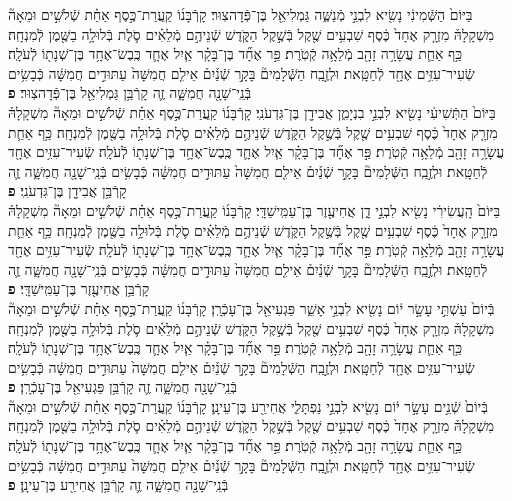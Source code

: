 \documentclass[twoside, openany, parskip=half, 11pt]{book}
\begin{document}
\begin{footnotesize}
\begin{multicols}{2}
בַּיּוֹם֙ הַשְּֿׁמִינִ֔י נָשִׂ֖יא לִבְנֵ֣י מְֿנַשֶּׁ֑ה גַּמְלִיאֵ֖ל בֶּן־פְּֿדָהצֽוּר׃ קָרְֿבָּנ֜וֹ קַֽעֲרַת־כֶּ֣סֶף אַחַ֗ת שְֿׁלֹשִׁ֣ים וּמֵאָה֘ מִשְׁקָלָהּ֒ מִזְרָ֤ק אֶחָד֙ כֶּ֔סֶף שִׁבְעִ֥ים שֶׁ֖קֶל בְּֿשֶׁ֣קֶל הַקֹּ֑דֶשׁ שְֿׁנֵיהֶ֣ם מְֿלֵאִ֗ים סֹ֛לֶת בְּֿלוּלָ֥ה בַשֶּׁ֖מֶן לְֿמִנְחָֽה׃ כַּ֥ף אַחַ֛ת עֲשָׂרָ֥ה זָהָ֖ב מְֿלֵאָ֥ה קְֿטֹֽרֶת׃  פַּ֣ר אֶחָ֞ד בֶּן־בָּקָ֗ר אַ֧יִל אֶחָ֛ד כֶּֽבֶשׂ־אֶחָ֥ד בֶּן־שְׁנָת֖וֹ לְֿעֹלָֽה׃ שְֿׂעִיר־עִזִּ֥ים אֶחָ֖ד לְֿחַטָּֽאת׃ וּלְזֶ֣בַֽח הַשְּֿׁלָמִים֘ בָּקָ֣ר שְֿׁנַ֒יִם֒ אֵילִ֤ם חֲמִשָּׁה֙ עַתּוּדִ֣ים חֲמִשָּׁ֔ה כְּֿבָשִׂ֥ים בְּֿנֵֽי־שָׁנָ֖ה חֲמִשָּׁ֑ה זֶ֛ה קָרְֿבַּ֥ן גַּמְלִיאֵ֖ל בֶּן־פְּֿדָהצֽוּר׃ \textbf{פ} \\
 בַּיּוֹם֙ הַתְּֿשִׁיעִ֔י נָשִׂ֖יא לִבְנֵ֣י בִנְיָמִ֑ן אֲבִידָ֖ן בֶּן־גִּדְעֹנִֽי׃ קָרְֿבָּנ֜וֹ קַֽעֲרַת־כֶּ֣סֶף אַחַ֗ת שְֿׁלֹשִׁ֣ים וּמֵאָה֘ מִשְׁקָלָהּ֒ מִזְרָ֤ק אֶחָד֙ כֶּ֔סֶף שִׁבְעִ֥ים שֶׁ֖קֶל בְּֿשֶׁ֣קֶל הַקֹּ֑דֶשׁ שְֿׁנֵיהֶ֣ם מְֿלֵאִ֗ים סֹ֛לֶת בְּֿלוּלָ֥ה בַשֶּׁ֖מֶן לְֿמִנְחָֽה׃ כַּ֥ף אַחַ֛ת עֲשָׂרָ֥ה זָהָ֖ב מְֿלֵאָ֥ה קְֿטֹֽרֶת׃ פַּ֣ר אֶחָ֞ד בֶּן־בָּקָ֗ר אַ֧יִל אֶחָ֛ד כֶּֽבֶשׂ־אֶחָ֥ד בֶּן־שְׁנָת֖וֹ לְֿעֹלָֽה׃ שְֿׂעִיר־עִזִּ֥ים אֶחָ֖ד לְֿחַטָּֽאת׃ וּלְזֶ֣בַֽח הַשְּֿׁלָמִים֘ בָּקָ֣ר שְֿׁנַ֒יִם֒ אֵילִ֤ם חֲמִשָּׁה֙ עַתּוּדִ֣ים חֲמִשָּׁ֔ה כְּֿבָשִׂ֥ים בְּֿנֵֽי־שָׁנָ֖ה חֲמִשָּׁ֑ה זֶ֛ה קָרְֿבַּ֥ן אֲבִידָ֖ן בֶּן־גִּדְעֹנִֽי׃ \textbf{פ} \\
בַּיּוֹם֙ הָֽעֲשִׂירִ֔י נָשִׂ֖יא לִבְנֵ֣י דָ֑ן אֲחִיעֶ֖זֶר בֶּן־עַמִּֽישַׁדָּֽי׃ קָרְֿבָּנ֜וֹ קַֽעֲרַת־כֶּ֣סֶף אַחַ֗ת שְֿׁלֹשִׁ֣ים וּמֵאָה֘ מִשְׁקָלָהּ֒ מִזְרָ֤ק אֶחָד֙ כֶּ֔סֶף שִׁבְעִ֥ים שֶׁ֖קֶל בְּֿשֶׁ֣קֶל הַקֹּ֑דֶשׁ שְֿׁנֵיהֶ֣ם מְֿלֵאִ֗ים סֹ֛לֶת בְּֿלוּלָ֥ה בַשֶּׁ֖מֶן לְֿמִנְחָֽה׃ כַּ֥ף אַחַ֛ת עֲשָׂרָ֥ה זָהָ֖ב מְֿלֵאָ֥ה קְֿטֹֽרֶת׃ פַּ֣ר אֶחָ֞ד בֶּן־בָּקָ֗ר אַ֧יִל אֶחָ֛ד כֶּֽבֶשׂ־אֶחָ֥ד בֶּן־שְׁנָת֖וֹ לְֿעֹלָֽה׃ שְֿׂעִיר־עִזִּ֥ים אֶחָ֖ד לְֿחַטָּֽאת׃ וּלְזֶ֣בַֽח הַשְּֿׁלָמִים֘ בָּקָ֣ר שְֿׁנַ֒יִם֒ אֵילִ֤ם חֲמִשָּׁה֙ עַתּוּדִ֣ים חֲמִשָּׁ֔ה כְּֿבָשִׂ֥ים בְּֿנֵֽי־שָׁנָ֖ה חֲמִשָּׁ֑ה זֶ֛ה קָרְֿבַּ֥ן אֲחִיעֶ֖זֶר בֶּן־עַמִּֽישַׁדָּֽי׃ \textbf{פ} \\
בְּֿיוֹם֙ עַשְׁתֵּ֣י עָשָׂ֣ר י֔וֹם נָשִׂ֖יא לִבְנֵ֣י אָשֵׁ֑ר פַּגְעִיאֵ֖ל בֶּן־עָכְֿרָֽן׃ קָרְֿבָּנ֜וֹ קַֽעֲרַת־כֶּ֣סֶף אַחַ֗ת שְֿׁלֹשִׁ֣ים וּמֵאָה֘ מִשְׁקָלָהּ֒ מִזְרָ֤ק אֶחָד֙ כֶּ֔סֶף שִׁבְעִ֥ים שֶׁ֖קֶל בְּֿשֶׁ֣קֶל הַקֹּ֑דֶשׁ שְֿׁנֵיהֶ֣ם מְֿלֵאִ֗ים סֹ֛לֶת בְּֿלוּלָ֥ה בַשֶּׁ֖מֶן לְֿמִנְחָֽה׃ כַּ֥ף אַחַ֛ת עֲשָׂרָ֥ה זָהָ֖ב מְֿלֵאָ֥ה קְֿטֹֽרֶת׃ פַּ֣ר אֶחָ֞ד בֶּן־בָּקָ֗ר אַ֧יִל אֶחָ֛ד כֶּֽבֶשׂ־אֶחָ֥ד בֶּן־שְׁנָת֖וֹ לְֿעֹלָֽה׃ שְֿׂעִיר־עִזִּ֥ים אֶחָ֖ד לְֿחַטָּֽאת׃ וּלְזֶ֣בַֽח הַשְּֿׁלָמִים֘ בָּקָ֣ר שְֿׁנַ֒יִם֒ אֵילִ֤ם חֲמִשָּׁה֙ עַתּוּדִ֣ים חֲמִשָּׁ֔ה כְּֿבָשִׂ֥ים בְּֿנֵֽי־שָׁנָ֖ה חֲמִשָּׁ֑ה זֶ֛ה קָרְֿבַּ֥ן פַּגְעִיאֵ֖ל בֶּן־עָכְֿרָֽן׃ \textbf{פ} \\
בְּֿיוֹם֙ שְֿׁנֵ֣ים עָשָׂ֣ר י֔וֹם נָשִׂ֖יא לִבְנֵ֣י נַפְתָּלִ֑י אֲחִירַ֖ע בֶּן־עֵינָֽן׃ קָרְֿבָּנ֜וֹ קַֽעֲרַת־כֶּ֣סֶף אַחַ֗ת שְֿׁלֹשִׁ֣ים וּמֵאָה֘ מִשְׁקָלָהּ֒ מִזְרָ֤ק אֶחָד֙ כֶּ֔סֶף שִׁבְעִ֥ים שֶׁ֖קֶל בְּֿשֶׁ֣קֶל הַקֹּ֑דֶשׁ שְֿׁנֵיהֶ֣ם מְֿלֵאִ֗ים סֹ֛לֶת בְּֿלוּלָ֥ה בַשֶּׁ֖מֶן לְֿמִנְחָֽה׃ כַּ֥ף אַחַ֛ת עֲשָׂרָ֥ה זָהָ֖ב מְֿלֵאָ֥ה קְֿטֹֽרֶת׃ פַּ֣ר אֶחָ֞ד בֶּן־בָּקָ֗ר אַ֧יִל אֶחָ֛ד כֶּֽבֶשׂ־אֶחָ֥ד בֶּן־שְׁנָת֖וֹ לְֿעֹלָֽה׃ שְֿׂעִיר־עִזִּ֥ים אֶחָ֖ד לְֿחַטָּֽאת׃ וּלְזֶ֣בַֽח הַשְּֿׁלָמִים֘ בָּקָ֣ר שְֿׁנַ֒יִם֒ אֵילִ֤ם חֲמִשָּׁה֙ עַתּוּדִ֣ים חֲמִשָּׁ֔ה כְּֿבָשִׂ֥ים בְּֿנֵֽי־שָׁנָ֖ה חֲמִשָּׁ֑ה זֶ֛ה קָרְֿבַּ֥ן אֲחִירַ֖ע בֶּן־עֵינָֽן׃ \textbf{פ} \\

\end{multicols}
\end{footnotesize}
\end{document}
